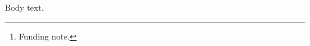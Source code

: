 \documentclass{IEEEtran}
\begin{document}
\author{Alice Smith, , and Bob Jones, \thanks{Funding note.}}
\maketitle
Body text.
\end{document}
